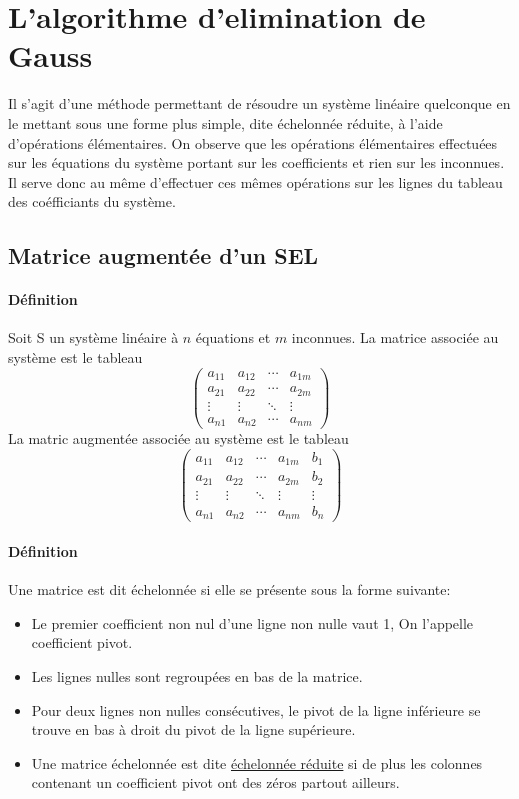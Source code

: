 \section{L'algorithme d'elimination de Gauss}
%
%
Il s'agit d'une méthode permettant de résoudre un système linéaire quelconque en le mettant sous une forme plus simple, dite échelonnée réduite, à l'aide d'opérations élémentaires.
On observe que les opérations élémentaires effectuées sur les équations du système portant sur les coefficients et rien sur les inconnues. Il serve donc au même d'effectuer ces mêmes opérations sur les lignes du tableau des coéfficiants du système.

%
\subsection{Matrice augmentée d'un SEL}
%
\paragraph{Définition} Soit S un système linéaire à $n$ équations et $m$ inconnues. La matrice associée au système est le tableau
$$\begin{pmatrix}
  a_{11} & a_{12} & \cdots & a_{1m} \\
  a_{21} & a_{22} & \cdots & a_{2m} \\
  \vdots  & \vdots  & \ddots & \vdots  \\
  a_{n1} & a_{n2} & \cdots & a_{nm}
 \end{pmatrix}$$
La matric augmentée associée au système est le tableau
$$\begin{pmatrix}
  a_{11} & a_{12} & \cdots & a_{1m} & b_{1} \\
  a_{21} & a_{22} & \cdots & a_{2m} & b_{2} \\
  \vdots  & \vdots  & \ddots & \vdots & \vdots  \\
  a_{n1} & a_{n2} & \cdots & a_{nm} & b_{n}
 \end{pmatrix}$$
 
\paragraph{Définition} Une matrice est dit échelonnée si elle se présente sous la forme suivante:
\begin{itemize}
  \item Le premier coefficient non nul d'une ligne non nulle vaut 1, On l'appelle coefficient pivot.
  \item Les lignes nulles sont regroupées en bas de la matrice.
  \item Pour deux lignes non nulles consécutives, le pivot de la ligne inférieure se trouve en bas à droit du pivot de la ligne supérieure.
  \item Une matrice échelonnée est dite \underline{échelonnée réduite} si de plus les colonnes contenant un coefficient pivot ont des zéros partout ailleurs.
\end{itemize}


